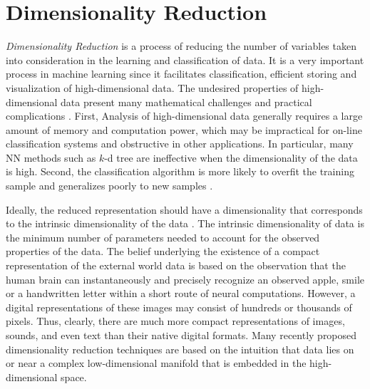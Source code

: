 \newpage{}

\section{Dimensionality Reduction}
\label{sec:dr}

\iftoggle{edit-mode}{\hspace{0pt}\marginpar{What is DR and what techniques are there?}}{}
\emph{Dimensionality Reduction} is a process of reducing the number of variables taken into consideration in the learning and classification of data. 
It is a very important process in machine learning since it facilitates classification, efficient storing and visualization of high-dimensional data. 
The undesired properties of high-dimensional data present many mathematical challenges and practical complications \cite{van2009dimensionality}. 
First, Analysis of high-dimensional data generally requires a large amount of memory and computation power, which may be impractical for on-line classification systems and obstructive in other applications. 
In particular, many NN methods such as $k$-d tree are ineffective when the dimensionality of the data is high.
Second, the classification algorithm is more likely to overfit the training sample and generalizes poorly to new samples \cite{aida2009word}.

\iftoggle{edit-mode}{\hspace{0pt}\marginpar{data Intrinsic dimensionality}}{}
Ideally, the reduced representation should have a dimensionality that corresponds to the intrinsic dimensionality of the data \cite{van2009dimensionality}.
The intrinsic dimensionality of data is the minimum number of parameters needed to account for the observed properties of the data. 
The belief underlying the existence of a compact representation of the external world data is based on the observation that the human brain can instantaneously and precisely recognize an observed apple, smile or a handwritten letter within a short route of neural computations. 
However, a digital representations of these images may consist of hundreds or thousands of pixels. 
Thus, clearly, there are much more compact representations of images, sounds, and even text than their native digital formats. 
Many recently proposed dimensionality reduction techniques are based on the intuition that data lies on or near a complex low-dimensional manifold that is embedded in the high-dimensional space.

